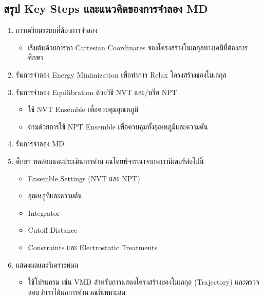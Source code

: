 \subsection{สรุป Key Steps และแนวคิดของการจำลอง MD}

\begin{enumerate}[topsep=0pt,noitemsep]
  \setlength\itemsep{0.5em}
  \item การเตรียมระบบที่ต้องการจำลอง
        \begin{itemize}[topsep=0pt,noitemsep]
          \setlength\itemsep{0.5em}
          \item เริ่มต้นด้วยการหา Cartesian Coordinates ของโครงสร้างโมเลกุลทางเคมีที่ต้องการศึกษา
        \end{itemize}

  \item รันการจำลอง Energy Minimization เพื่อทำการ Relax โครงสร้างของโมเลกุล

  \item รันการจำลอง Equilibration ด้วยวิธี NVT และ/หรือ NPT
        \begin{itemize}[topsep=0pt,noitemsep]
          \setlength\itemsep{0.5em}
          \item ใช้ NVT Ensemble เพื่อควบคุมอุณหภูมิ

          \item ตามด้วยการใช้ NPT Ensemble เพื่อควบคุมทั้งอุณหภูมิและความดัน
        \end{itemize}

  \item รันการจำลอง MD

  \item ศึกษา ทดสอบและประเมินการคำนวณโดยพิจารณาจากพารามิเตอร์ต่อไปนี้
        \begin{itemize}[topsep=0pt,noitemsep]
          \setlength\itemsep{0.5em}
          \item Ensemble Settings (NVT และ NPT)

          \item อุณหภูทิและความดัน

          \item Integrator

          \item Cutoff Distance

          \item Constraints และ Electrostatic Treatments
        \end{itemize}

  \item แสดงผลและวิเคราะห์ผล
        \begin{itemize}[topsep=0pt,noitemsep]
          \setlength\itemsep{0.5em}
          \item ใช้โปรแกรม เช่น VMD สำหรับการแสดงโครงสร้างของโมเลกุล (Trajectory) และตรวจสอบว่าเราได้ผลการคำนวณที่เหมาะสม
        \end{itemize}
\end{enumerate}


